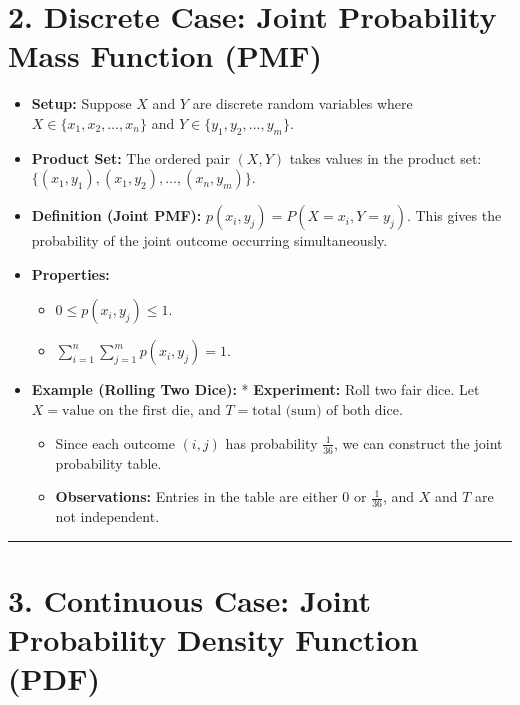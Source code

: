 \documentclass{article}
\begin{document}
\section*{2. Discrete Case: Joint Probability Mass Function (PMF)}

\begin{itemize}[label=\textbullet]
    \item \textbf{Setup:} Suppose $X$ and $Y$ are discrete random variables where $X \in \{x_1, x_2, \dots, x_n\}$ and $Y \in \{y_1, y_2, \dots, y_m\}$.
    \item \textbf{Product Set:} The ordered pair $(X, Y)$ takes values in the product set: \\
    $\{(x_1, y_1), (x_1, y_2), \dots, (x_n, y_m)\}$.
    \item \textbf{Definition (Joint PMF):} $p(x_i, y_j) = P(X = x_i, Y = y_j)$. This gives the probability of the joint outcome occurring simultaneously.
    \item \textbf{Properties:}
    \begin{itemize}[label=$\circ$]
        \item $0 \le p(x_i, y_j) \le 1$.
        \item $\sum_{i=1}^{n} \sum_{j=1}^{m} p(x_i, y_j) = 1$.
    \end{itemize}
    \item \textbf{Example (Rolling Two Dice):} * \textbf{Experiment:} Roll two fair dice. Let $X = \text{value on the first die}$, and $T = \text{total (sum) of both dice}$.
    \begin{itemize}[label=$\circ$]
        \item Since each outcome $(i, j)$ has probability $\frac{1}{36}$, we can construct the joint probability table.
        \item \textbf{Observations:} Entries in the table are either $0$ or $\frac{1}{36}$, and $X$ and $T$ are not independent.
    \end{itemize}
\end{itemize}

\vspace{0.25cm}
\hrule
\vspace{0.25cm}

\section*{3. Continuous Case: Joint Probability Density Function (PDF)}
\end{document}
